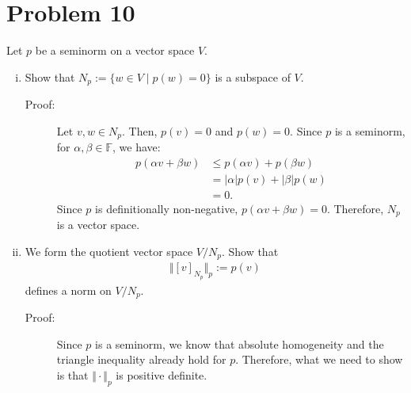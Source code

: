 \documentclass[10pt]{extarticle}
\begin{document}
  \section{Problem 10}%
  Let $p$ be a seminorm on a vector space $V$.
  \begin{enumerate}[(i)]
    \item Show that $N_p := \{w\in V\mid p(w)=0\}$ is a subspace of $V$.
      \begin{description}
        \item[Proof:] Let $v,w\in N_p$. Then, $p(v) = 0$ and $p(w) = 0$. Since $p$ is a seminorm, for $\alpha,\beta\in \mathbb{F}$, we have:
          \begin{align*}
            p(\alpha v + \beta w) &\leq p(\alpha v) + p(\beta w)\\
                                  &= |\alpha| p(v) + |\beta|p(w)\\
                                  &= 0.
          \end{align*}
          Since $p$ is definitionally non-negative, $p(\alpha v + \beta w) = 0$. Therefore, $N_p$ is a vector space.
      \end{description}
    \item We form the quotient vector space $V/N_p$. Show that
      \begin{align*}
        \Vert [v]_{N_p}\Vert_{p} := p(v)
      \end{align*}
      defines a norm on $V/N_p$.
      \begin{description}
        \item[Proof:] Since $p$ is a seminorm, we know that absolute homogeneity and the triangle inequality already hold for $p$. Therefore, what we need to show is that $\Vert \cdot \Vert_{p}$ is positive definite.\\


\end{description}
\end{enumerate}
\end{document}
